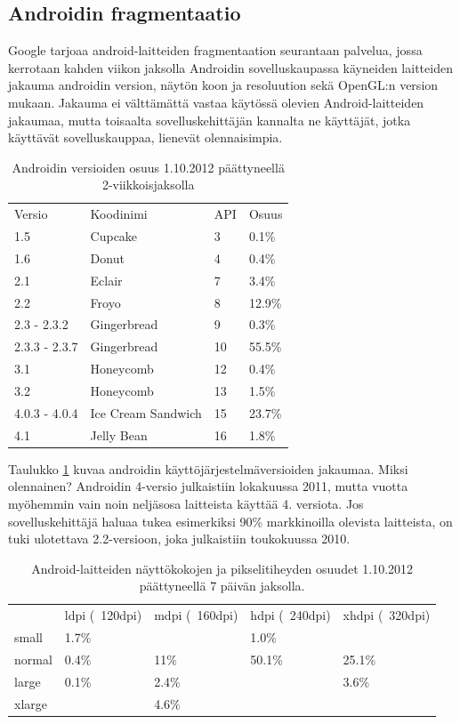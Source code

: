 \subsection{Androidin fragmentaatio}

Google tarjoaa android-laitteiden fragmentaation seurantaan palvelua, jossa kerrotaan kahden viikon jaksolla Androidin sovelluskaupassa käyneiden laitteiden jakauma androidin version, näytön koon ja resoluution sekä OpenGL:n version mukaan.\cite{android_versions} Jakauma ei välttämättä vastaa käytössä olevien Android-laitteiden jakaumaa, mutta toisaalta sovelluskehittäjän kannalta ne käyttäjät, jotka käyttävät sovelluskauppaa, lienevät olennaisimpia.

\begin{table}[h]
\centering
\begin{tabular}{ l l l l }
  Versio & Koodinimi & API & Osuus \\
  1.5 & Cupcake & 3 & 0.1\% \\
  1.6 & Donut & 4 & 0.4\% \\
  2.1 & Eclair & 7 & 3.4\% \\
  2.2 & Froyo & 8 & 12.9\% \\
  2.3 - 2.3.2 & Gingerbread & 9 & 0.3\% \\
  2.3.3 - 2.3.7 & Gingerbread & 10 & 55.5\% \\
  3.1 & Honeycomb & 12 & 0.4\% \\
  3.2 & Honeycomb & 13 & 1.5\% \\
  4.0.3 - 4.0.4 & Ice Cream Sandwich & 15 & 23.7\% \\
  4.1 & Jelly Bean & 16 & 1.8\% \\
\end{tabular}
\caption{Androidin versioiden osuus 1.10.2012 päättyneellä 2-viikkoisjaksolla}
\label{tab:android_versions}
\end{table}

Taulukko \ref{tab:android_versions} kuvaa androidin käyttöjärjestelmäversioiden jakaumaa. Miksi olennainen? Androidin 4-versio julkaistiin lokakuussa 2011, mutta vuotta myöhemmin vain noin neljäsosa laitteista käyttää 4. versiota. Jos sovelluskehittäjä haluaa tukea esimerkiksi 90\% markkinoilla olevista laitteista, on tuki ulotettava 2.2-versioon, joka julkaistiin toukokuussa 2010. \cite{android_version_history}

\begin{table}[h]
\centering
\begin{tabular}{ l l l l l }
   & ldpi (~120dpi) & mdpi (~160dpi) & hdpi (~240dpi) & xhdpi (~320dpi) \\
  small & 1.7\% &  & 1.0\% &  \\
  normal & 0.4\% & 11\% & 50.1\% & 25.1\% \\
  large & 0.1\% & 2.4\% &  & 3.6\% \\
  xlarge &  & 4.6\% &  &  \\
\end{tabular}
\caption{Android-laitteiden näyttökokojen ja pikselitiheyden osuudet 1.10.2012 päättyneellä 7 päivän jaksolla.}
\label{tab:screen_sizes}
\end{table}

